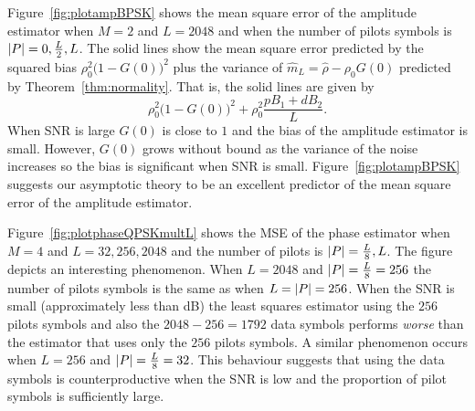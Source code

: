 \documentclass[journal]{IEEEtran}
\begin{document}
Figure~\ref{fig:plotampBPSK} %
shows the mean square error of the amplitude estimator when $M=2$ and $L=2048$ and when the number of pilots symbols is ${\left\vert P \right\vert} = 0, \tfrac{L}{2}, L$.  The solid lines show the mean square error predicted by the squared bias $\rho_0^2\big(1 - G(0)\big)^2$ plus the variance of $\hat{m}_L = \hat{\rho} - \rho_0G(0)$ predicted by Theorem~\ref{thm:normality}.  That is, the solid lines are given by
\[
\rho_0^2\big(1 - G(0)\big)^2 + \rho_0^2\frac{p B_1 + d B_2}{L}. 
\]
When SNR is large $G(0)$ is close to $1$ and the bias of the amplitude estimator is small.  However, $G(0)$ grows without bound as the variance of the noise increases so the bias is significant when SNR is small.  Figure~\ref{fig:plotampBPSK} suggests our asymptotic theory to be an excellent predictor of the mean square error of the amplitude estimator.

Figure~\ref{fig:plotphaseQPSKmultL} shows the MSE of the phase estimator when $M=4$ and $L=32,256, 2048$ and the number of pilots is ${\left\vert P \right\vert}=\tfrac{L}{8},L$.  The figure depicts an interesting phenomenon.  When $L=2048$ and ${\left\vert P \right\vert} = \tfrac{L}{8} = 256$ the number of pilots symbols is the same as when $L={\left\vert P \right\vert} = 256$.  When the SNR is small (approximately less than \unit[0]{dB}) the least squares estimator using the $256$ pilots symbols and also the $2048-256=1792$ data symbols performs \emph{worse} than the estimator that uses only the $256$ pilots symbols.  A similar phenomenon occurs when $L=256$ and ${\left\vert P \right\vert} = \tfrac{L}{8} = 32$.  This behaviour suggests that using the data symbols is counterproductive when the SNR is low and the proportion of pilot symbols is sufficiently large.

\end{document}
